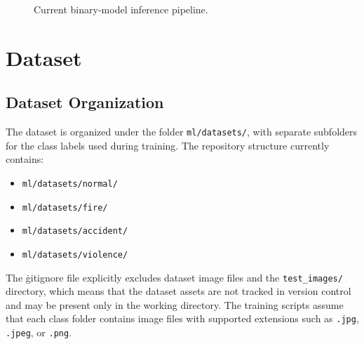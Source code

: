 \documentclass[11pt,a4paper]{article}
\begin{document}
\begin{figure}[h]
\centering
{}
\caption{Current binary-model inference pipeline.}
\label{fig:binary-pipeline}
\end{figure}

\section{Dataset}
\subsection{Dataset Organization}
The dataset is organized under the folder \texttt{ml/datasets/}, with separate subfolders for the class labels used during training. The repository structure currently contains:
\begin{itemize}[leftmargin=1.5em]
    \item \texttt{ml/datasets/normal/}
    \item \texttt{ml/datasets/fire/}
    \item \texttt{ml/datasets/accident/}
    \item \texttt{ml/datasets/violence/}
\end{itemize}
The \.gitignore file explicitly excludes dataset image files and the \texttt{test\_images/} directory, which means that the dataset assets are not tracked in version control and may be present only in the working directory. The training scripts assume that each class folder contains image files with supported extensions such as \texttt{.jpg}, \texttt{.jpeg}, or \texttt{.png}.
\end{document}
